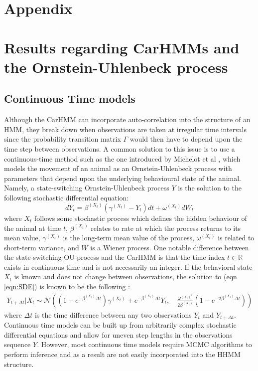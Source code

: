 
\renewcommand*{\thesubsection}{\Alph{subsection}}

\section*{Appendix}

\setcounter{subsection}{0}

\section{Results regarding CarHMMs and the Ornstein-Uhlenbeck process}

\subsection{Continuous Time models}

Although the CarHMM can incorporate auto-correlation into the structure of an HMM, they break down when observations are taken at irregular time intervals since the probability transition matrix $\Gamma$ would then have to depend upon the time step between observations. A common solution to this issue is to use a continuous-time method such as the one introduced by Michelot et al \citep{Michelot:2019}, which models the movement of an animal as an Ornstein-Uhlenbeck process with parameters that depend upon the underlying behavioural state of the animal. Namely, a state-switching Ornstein-Uhlenbeck process $Y$ is the solution to the following stochastic differential equation:
%
\begin{equation}
    \label{eqn:SDE}
    dY_t = \beta^{(X_t)}(\gamma^{(X_t)} - Y_t)dt + \omega^{(X_t)} dW_t
\end{equation}
%
where $X_t$ follows some stochastic process which defines the hidden behaviour of the animal at time $t$, $\beta^{(X_t)}$ relates to rate at which the process returns to its mean value, $\gamma^{(X_t)}$ is the long-term mean value of the process, $\omega^{(X_t)}$ is related to short-term variance, and $W$ is a Wiener process. One notable difference between the state-switching OU process and the CarHMM is that the time index $t \in \mathbb{R}$ exists in continuous time and is not necessarily an integer. If the behavioral state $X_t$ is known and does not change between observations, the solution to (eqn \ref{eqn:SDE}) is known to be the following \citep{Michelot:2019}:
%
\begin{align}
Y_{t+\Delta t} | X_{t} \sim \mathcal{N}\left((1-e^{-\beta^{(X_t)}\Delta t})\gamma^{(X_t)} + e^{-\beta^{(X_t)}\Delta t} Y_t,\quad \frac{\omega^{(X_t)^2}}{2\beta^{(X_t)}} (1-e^{-2\beta^{(X_t)}\Delta t})\right)
\label{eqn:OU_sol}
\end{align}
%
where $\Delta t$ is the time difference between any two observations $Y_t$ and $Y_{t+\Delta t}$. Continuous time models can be built up from arbitrarily complex stochastic differential equations and allow for uneven step lengths in the observations sequence $Y$. However, most continuous time models require MCMC algorithms to perform inference and as a result are not easily incorporated into the HHMM structure.

